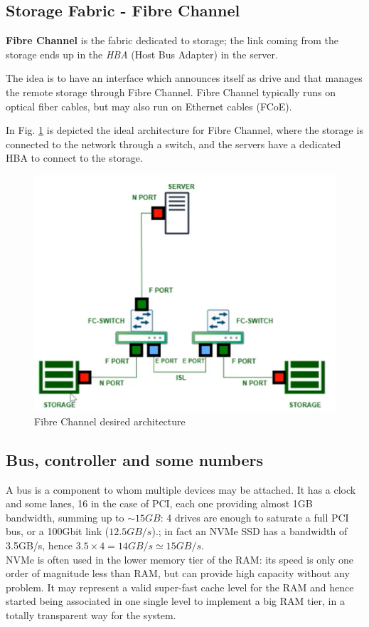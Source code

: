 \subsection{Storage Fabric - Fibre Channel}
\textbf{Fibre Channel} is the fabric dedicated to storage; the link coming from the storage ends up in the \textit{HBA} (Host Bus Adapter) in the server.
\begin{paracol}{2}

   The idea is to have an interface which announces itself as drive and that manages the remote storage through Fibre Channel.
   Fibre Channel typically runs on optical fiber cables, but may also run on Ethernet cables (FCoE).

   In Fig. \ref{fig:fibrechannel} is depicted the ideal architecture for Fibre Channel, where the storage is connected to the network through a switch, and the servers have a dedicated HBA to connect to the storage.
   
   \switchcolumn
   \begin{figure}[htbp]
      \centering
      \includegraphics{images/fibrechannel.png}
      \caption{Fibre Channel desired architecture}
      \label{fig:fibrechannel}
   \end{figure}
   
\end{paracol}
   
\subsection{Bus, controller and some numbers}
A bus is a component to whom multiple devices may be attached. It has a clock and some lanes, 16 in the case of PCI, each one providing almost 1GB bandwidth, summing up to $\sim 15GB$: 4 drives are enough to saturate a full PCI bus, or a 100Gbit link ($12.5GB/s$).;
in fact an NVMe SSD has a bandwidth of 3.5GB/s, hence $3.5\times 4 = 14GB/s \simeq 15GB/s$.\\
NVMe is often used in the lower memory tier of the RAM: its speed is only one order of magnitude less than RAM, but can provide high capacity without any problem.
It may represent a valid super-fast cache level for the RAM and hence started being associated in one single level to implement a big RAM tier, in a totally transparent way for the system.


